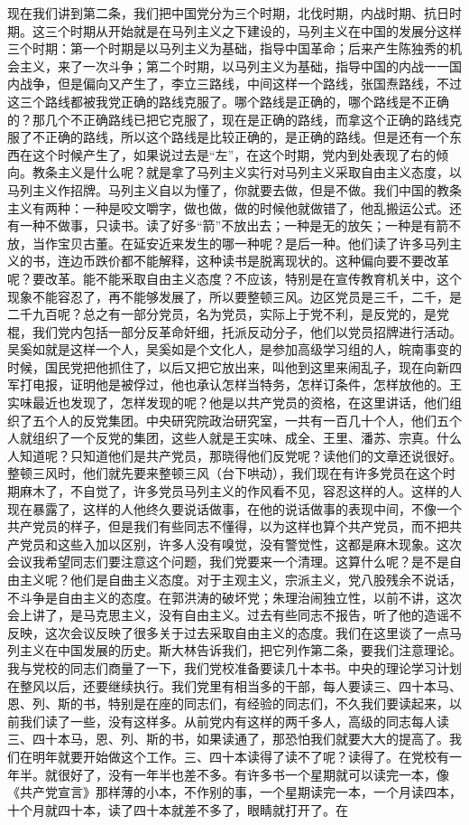 现在我们讲到第二条，我们把中国党分为三个时期，北伐时期，内战时期、抗日时期。这三个时期从开始就是在马列主义之下建设的，马列主义在中国的发展分这样三个时期：第一个时期是以马列主义为基础，指导中国革命；后来产生陈独秀的机会主义，来了一次斗争；第二个时期，以马列主义为基础，指导中国的内战一一国内战争，但是偏向又产生了，李立三路线，中间这样一个路线，张国焘路线，不过这三个路线都被我党正确的路线克服了。哪个路线是正确的，哪个路线是不正确的？那几个不正确路线已把它克服了，现在是正确的路线，而拿这个正确的路线克服了不正确的路线，所以这个路线是比较正确的，是正确的路线。但是还有一个东西在这个时候产生了，如果说过去是“左”，在这个时期，党内到处表现了右的倾向。教条主义是什么呢？就是拿了马列主义实行对马列主义采取自由主义态度，以马列主义作招牌。马列主义自以为懂了，你就要去做，但是不做。我们中国的教条主义有两种：一种是咬文嚼字，做也做，做的时候他就做错了，他乱搬运公式。还有一种不做事，只读书。读了好多“箭”不放出去；一种是无的放矢；一种是有箭不放，当作宝贝古董。在延安近来发生的哪一种呢？是后一种。他们读了许多马列主义的书，连边币跌价都不能解释，这种读书是脱离现状的。这种偏向要不要改革呢？要改革。能不能釆取自由主义态度？不应该，特别是在宣传教育机关中，这个现象不能容忍了，再不能够发展了，所以要整顿三风。边区党员是三千，二千，是二千九百呢？总之有一部分党员，名为党员，实际上于党不利，是反党的，是党棍，我们党内包括一部分反革命奸细，托派反动分子，他们以党员招牌进行活动。吴奚如就是这样一个人，吴奚如是个文化人，是参加高级学习组的人，皖南事变的时候，国民党把他抓住了，以后又把它放出来，叫他到这里来闹乱子，现在向新四军打电报，证明他是被俘过，他也承认怎样当特务，怎样订条件，怎样放他的。王实味最近也发现了，怎样发现的呢？他是以共产党员的资格，在这里讲话，他们组织了五个人的反党集团。中央研究院政治研究室，一共有一百几十个人，他们五个人就组织了一个反党的集团，这些人就是王实味、成全、王里、潘苏、宗真。什么人知道呢？只知道他们是共产党员，那晓得他们反党呢？读他们的文章还说很好。整顿三风时，他们就先要来整顿三风（台下哄动），我们现在有许多党员在这个时期麻木了，不自觉了，许多党员马列主义的作风看不见，容忍这样的人。这样的人现在暴露了，这样的人他终久要说话做事，在他的说话做事的表现中间，不像一个共产党员的样子，但是我们有些同志不懂得，以为这样也算个共产党员，而不把共产党员和这些入加以区别，许多人没有嗅觉，没有警觉性，这都是麻木现象。这次会议我希望同志们要注意这个问题，我们党要来一个清理。这算什么呢？是不是自由主义呢？他们是自曲主义态度。对于主观主义，宗派主义，党八股残余不说话，不斗争是自由主义的态度。在郭洪涛的破坏党；朱理治闹独立性，以前不讲，这次会上讲了，是马克思主义，没有自由主义。过去有些同志不报告，听了他的造谣不反映，这次会议反映了很多关于过去采取自由主义的态度。我们在这里谈了一点马列主义在中国发展的历史。斯大林告诉我们，把它列作第二条，要我们注意理论。我与党校的同志们商量了一下，我们党校准备要读几十本书。中央的理论学习计划在整风以后，还要继续执行。我们党里有相当多的干部，每人要读三、四十本马、恩、列、斯的书，特别是在座的同志们，有经验的同志们，不久我们要读起来，以前我们读了一些，没有这样多。从前党内有这样的两千多人，高级的同志每人读三、四十本马，恩、列、斯的书，如果读通了，那恐怕我们就要大大的提高了。我们在明年就要开始做这个工作。三、四十本读得了读不了呢？读得了。在党校有一年半。就很好了，没有一年半也差不多。有许多书一个星期就可以读完一本，像《共产党宣言》那样薄的小本，不作别的事，一个星期读完一本，一个月读四本，十个月就四十本，读了四十本就差不多了，眼睛就打开了。在